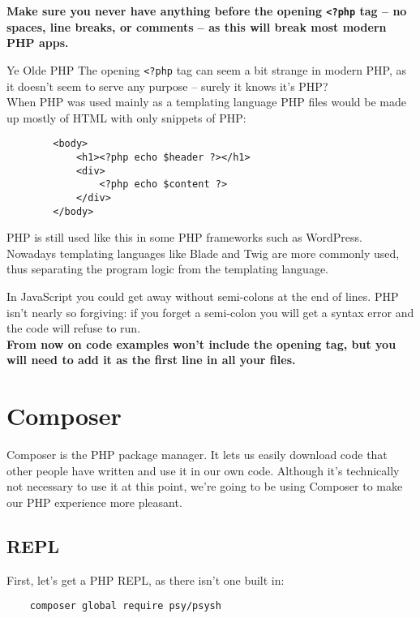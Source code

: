 \textbf{Make sure you never have anything before the opening \texttt{<?php} tag – no spaces, line breaks, or comments – as this will break most modern PHP apps.}


\begin{infobox}{Ye Olde PHP}
    The opening \texttt{<?php} tag can seem a bit strange in modern PHP, as it doesn't seem to serve any purpose – surely it knows it's PHP?
    \\

    When PHP was used mainly as a templating language PHP files would be made up mostly of HTML with only snippets of PHP:

    \begin{verbatim}
        <body>
            <h1><?php echo $header ?></h1>
            <div>
                <?php echo $content ?>
            </div>
        </body>
    \end{verbatim}

    PHP is still used like this in some PHP frameworks such as WordPress. Nowadays templating languages like Blade and Twig are more commonly used, thus separating the program logic from the templating language.
\end{infobox}

In JavaScript you could get away without semi-colons at the end of lines. PHP isn't nearly so forgiving: if you forget a semi-colon you will get a syntax error and the code will refuse to run.
\\

\textbf{From now on code examples won't include the opening tag, but you will need to add it as the first line in all your files.}


\section{Composer}

Composer is the PHP package manager. It lets us easily download code that other people have written and use it in our own code. Although it's technically not necessary to use it at this point, we're going to be using Composer to make our PHP experience more pleasant.

\subsection{REPL}

First, let's get a PHP REPL, as there isn't one built in:

\begin{verbatim}
    composer global require psy/psysh
\end{verbatim}

